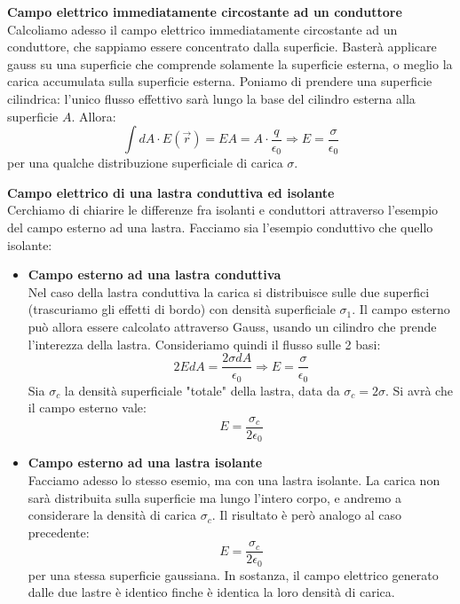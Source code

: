 \documentclass[a4paper,12pt]{article}
\begin{document}
\par\smallskip
\textbf{Campo elettrico immediatamente circostante ad un conduttore} \\
Calcoliamo adesso il campo elettrico immediatamente circostante ad un conduttore, che sappiamo essere concentrato dalla superficie. Basterà applicare gauss su una superficie che comprende solamente la superficie esterna, o meglio
la carica accumulata sulla superficie esterna. Poniamo di prendere una superficie cilindrica: l'unico flusso effettivo sarà lungo la base del cilindro esterna alla superficie $A$. Allora:
$$ \int dA \cdot E(\vec{r}) = E A = A \cdot \frac{q}{\epsilon_0} \Rightarrow E = \frac{\sigma}{\epsilon_0} $$
per una qualche distribuzione superficiale di carica $\sigma$.
\par\smallskip
\textbf{Campo elettrico di una lastra conduttiva ed isolante} \\
Cerchiamo di chiarire le differenze fra isolanti e conduttori attraverso l'esempio del campo esterno ad una lastra. Facciamo sia l'esempio conduttivo che quello isolante:
\begin{itemize}
  \item \textbf{Campo esterno ad una lastra conduttiva} \\
    Nel caso della lastra conduttiva la carica si distribuisce sulle due superfici (trascuriamo gli effetti di bordo) con densità superficiale $\sigma_1$. Il campo esterno può allora essere calcolato attraverso Gauss,
    usando un cilindro che prende l'interezza della lastra. Consideriamo quindi il flusso sulle 2 basi:
    $$ 2 E dA = \frac{2\sigma dA}{\epsilon_0} \Rightarrow E = \frac{\sigma}{\epsilon_0} $$
    Sia $\sigma_c$ la densità superficiale "totale" della lastra, data da $\sigma_c = 2\sigma$. Si avrà che il campo esterno vale:
    $$ E = \frac{\sigma_c}{2\epsilon_0}$$
  \item \textbf{Campo esterno ad una lastra isolante} \\
    Facciamo adesso lo stesso esemio, ma con una lastra isolante. La carica non sarà distribuita sulla superficie ma lungo l'intero corpo, e andremo a considerare la densità di carica $\sigma_c$. Il risultato è però analogo
    al caso precedente:
    $$ E = \frac{\sigma_c}{2\epsilon_0} $$
    per una stessa superficie gaussiana. In sostanza, il campo elettrico generato dalle due lastre è identico finche è identica la loro densità di carica.
\end{itemize}
\
\end{document}
